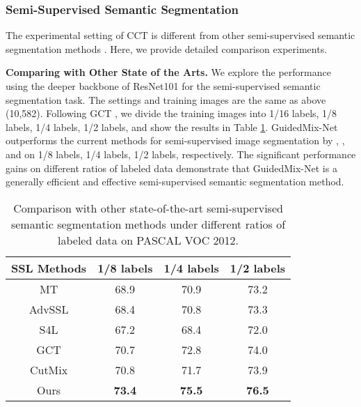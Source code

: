 \subsubsection{Semi-Supervised Semantic Segmentation} 
The experimental setting of CCT \cite{ouali2020semi} is different from other semi-supervised semantic segmentation methods \cite{2018Adversarial, zhai2019s4l, ke2020guided, french2020semi}.
Here, we provide detailed comparison experiments.

\textbf{Comparing with Other State of the Arts.}
We explore the performance using the deeper backbone of ResNet101 for the semi-supervised semantic segmentation task.
The settings and training images are the same as above (10,582). 
Following GCT \cite{ke2020guided}, we divide the training images into 1/16 labels, 1/8 labels, 1/4 labels, 1/2 labels, and show the results in Table \ref{comparison with other ssl}.
GuidedMix-Net outperforms the current methods for semi-supervised image segmentation by , , and  on 1/8 labels, 1/4 labels, 1/2 labels, respectively.
The significant performance gains on different ratios of labeled data demonstrate that GuidedMix-Net is a generally efficient and effective semi-supervised semantic segmentation method.  

\begin{table}[h]
\small
\centering
\caption{Comparison with other state-of-the-art semi-supervised semantic segmentation methods under different ratios of labeled data on PASCAL VOC 2012.}
\begin{tabular}{c|c|c|c}
\hline
	SSL Methods & 1/8 labels & 1/4 labels & 1/2 labels\\\hline
	MT \cite{2017Mean}  & 68.9 & 70.9 & 73.2 \\
	AdvSSL \cite{2018Adversarial} & 68.4 & 70.8 & 73.3 \\
	S4L \cite{zhai2019s4l} & 67.2 & 68.4 & 72.0 \\
	GCT \cite{ke2020guided} & 70.7 & 72.8 & 74.0 \\
	CutMix \cite{french2020semi} & 70.8 & 71.7 & 73.9 \\
	Ours & \textbf{73.4} & \textbf{75.5} & \textbf{76.5}\\\hline
\end{tabular}
\label{comparison with other ssl}
\end{table}


